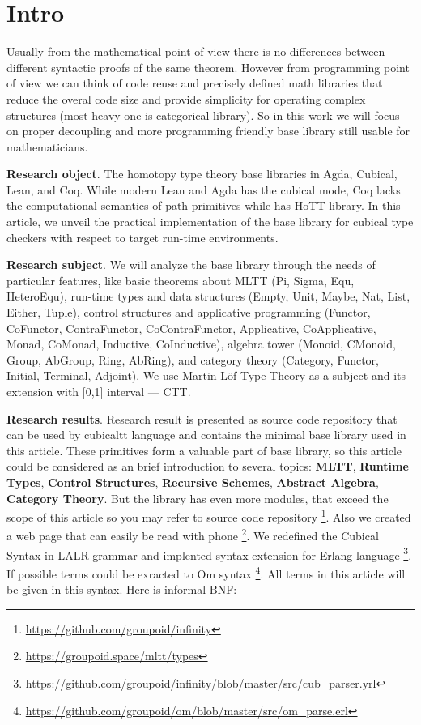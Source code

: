 \documentclass{article}
\begin{document}
\newpage
\tableofcontents

\newpage
\section{Intro}

Usually from the mathematical point of view there is no differences between
different syntactic proofs of the same theorem. However from programming point of view
we can think of code reuse and precisely defined math libraries that reduce
the overal code size and provide simplicity for operating complex
structures (most heavy one is categorical library). So in this work we will focus
on proper decoupling and more programming friendly base library still usable
for mathematicians.

{\bf Research object}. The homotopy type theory base libraries in Agda, Cubical, Lean, and Coq.
While modern Lean and Agda has the cubical mode, Coq lacks the computational semantics of path primitives
while has HoTT library. In this article, we unveil the practical implementation of the
base library for cubical type checkers with respect to target run-time environments.

{\bf Research subject}. We will analyze the base library through the needs of particular features,
like basic theorems about MLTT (Pi, Sigma, Equ, HeteroEqu), run-time types and data
structures (Empty, Unit, Maybe, Nat, List, Either, Tuple), control structures and applicative programming
(Functor, CoFunctor, ContraFunctor, CoContraFunctor, Applicative, CoApplicative, Monad,
CoMonad, Inductive, CoInductive), algebra tower (Monoid, CMonoid, Group, AbGroup, Ring, AbRing),
and category theory (Category, Functor, Initial, Terminal, Adjoint).
We use Martin-Löf Type Theory as a subject and its extension with [0,1] interval --- CTT.

{\bf Research results}. Research result is presented as source code repository that can be used by
cubicaltt language and contains the minimal base library used in this article.
These primitives form a valuable part of base library, so this article could be
considered as an brief introduction to several topics: {\bf MLTT}, {\bf Runtime Types},
{\bf Control Structures},  {\bf Recursive Schemes},
{\bf Abstract Algebra}, {\bf Category Theory}.
But the library has even more modules, that
exceed the scope of this article so you may refer to source code
repository \footnote{\url{https://github.com/groupoid/infinity}}.
Also we created a web page that can easily be read with phone \footnote{\url{https://groupoid.space/mltt/types}}.
We redefined the Cubical Syntax in LALR grammar and implented
syntax extension for Erlang language \footnote{\url{https://github.com/groupoid/infinity/blob/master/src/cub_parser.yrl}}.
If possible terms could be exracted
to Om syntax \footnote{\url{https://github.com/groupoid/om/blob/master/src/om_parse.erl}}.
All terms in this article will be given in this syntax. Here is informal BNF:
\end{document}
